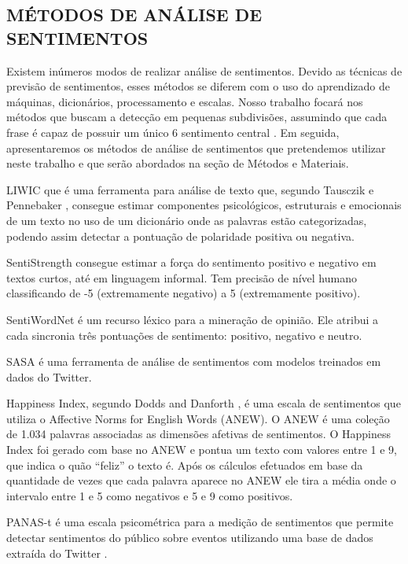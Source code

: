 \documentclass[12pt, a4paper]{article}
\begin{document}
\newpage
\subsection{MÉTODOS DE ANÁLISE DE SENTIMENTOS}

\hspace*{0.8cm}Existem inúmeros modos de realizar análise de sentimentos. Devido as técnicas de previsão de sentimentos, esses métodos se diferem com o uso do aprendizado de máquinas, dicionários, processamento e escalas. Nosso trabalho focará nos métodos que buscam a detecção em pequenas subdivisões, assumindo que cada frase é capaz de possuir um único  6 sentimento central \cite{Liu}. Em seguida, apresentaremos os métodos de análise de sentimentos que pretendemos utilizar neste trabalho e que serão abordados na seção de Métodos e Materiais.

LIWIC que é uma ferramenta para análise de texto que, segundo Tausczik e Pennebaker \citeyear{Tausczik}, consegue estimar componentes psicológicos, estruturais e emocionais de um texto no uso de um dicionário onde as palavras estão categorizadas, podendo assim detectar a pontuação de polaridade positiva ou negativa.

SentiStrength consegue estimar a força do sentimento positivo e negativo em textos curtos, até em linguagem informal. Tem precisão de nível humano classificando de -5 (extremamente negativo) a 5 (extremamente positivo).

SentiWordNet é um recurso léxico para a mineração de opinião. Ele atribui a cada sincronia três pontuações de sentimento: positivo, negativo e neutro.

SASA é uma ferramenta de análise de sentimentos com modelos treinados em dados do Twitter.

Happiness Index, segundo Dodds and Danforth \citeyear{Dodds}, é uma escala de sentimentos que utiliza o Affective Norms for English Words (ANEW). O ANEW é uma coleção de 1.034 palavras associadas as dimensões afetivas de sentimentos. O Happiness Index foi gerado com base no ANEW e pontua um texto com valores entre 1 e 9, que indica o quão “feliz” o texto é. Após os cálculos efetuados em base da quantidade de vezes que cada palavra aparece no ANEW ele tira a média onde o intervalo entre 1 e 5 como negativos e 5 e 9 como positivos.

PANAS-t é uma escala psicométrica para a medição de sentimentos que permite detectar sentimentos do público sobre eventos utilizando uma base de dados extraída do Twitter \cite{Goncalves}.
\end{document}
